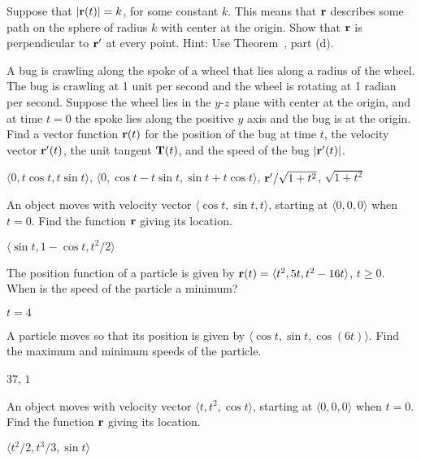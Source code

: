 \begin{theorem}
\begin{exercises}
\exercise Suppose that $|{\bf r}(t)|=k$, for some constant $k$. This
means that $\bf r$ describes some path on the sphere of radius $k$
with center at the origin. Show that $\bf r$ is perpendicular to ${\bf
  r}'$ at every point. Hint: Use Theorem~, part (d).
\label{exercise:derivative is perpendicular}

\exercise A bug is crawling along the spoke of a wheel that lies along
a radius of the wheel. The bug is crawling at 1 unit per second and
the wheel is rotating at 1 radian per second. Suppose the wheel lies
in the $y$-$z$ plane with center at the origin, and at time $t=0$ the
spoke lies along the positive $y$ axis and the bug is at the origin. 
Find a vector function ${\bf r}(t)$
for the position of the bug at time $t$, the velocity vector
${\bf r}'(t)$, the unit tangent ${\bf T}(t)$, and the speed of the bug
$|{\bf r}'(t)|$.
\begin{answer} $\langle 0,t\cos t,t\sin t\rangle$, 
$\langle 0,\cos t-t\sin t,\sin t+t\cos t\rangle$,
${\bf r}'/\sqrt{1+t^2}$, $\sqrt{1+t^2}$
\end{answer}

\exercise An object moves with velocity vector $\langle \cos t, \sin t,
t\rangle$, starting at $\langle 0,0,0\rangle$ when $t=0$. Find the function
${\bf r}$ giving its location.
\begin{answer} $\langle \sin t,1-\cos t,t^2/2\rangle$
\end{answer}


\exercise The position function of a particle is given by ${\bf r}(t) =
\langle t^2,5t,t^2-16t\rangle$, $t\geq 0$.  When is the speed of the particle
a minimum?
\begin{answer} $t=4$
\end{answer}

\item{\question} A particle moves so that its position is given by
$\langle \cos t, \sin t, \cos(6t)\rangle$. Find the maximum and
minimum speeds of the particle.
\begin{answer} $37$, $1$
\end{answer}

\exercise An object moves with velocity vector $\langle t, t^2,
\cos t\rangle$, starting at $\langle 0,0,0\rangle$ when $t=0$.
 Find the function
${\bf r}$ giving its location.
\begin{answer} $\langle t^2/2,t^3/3,\sin t\rangle$
\end{answer}


\end{exercises}
\end{theorem}
